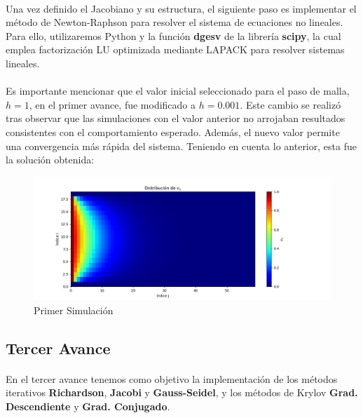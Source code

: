 \documentclass{article}
\begin{document}
  \paragraph{}
  Una vez definido el Jacobiano y su estructura, el siguiente paso es implementar el método de Newton-Raphson para resolver el sistema de ecuaciones no lineales. Para ello, utilizaremos Python y la función \textbf{dgesv} de la librería \textbf{scipy}, la cual emplea factorización LU optimizada mediante LAPACK para resolver sistemas lineales.

  \paragraph{}
  Es importante mencionar que el valor inicial seleccionado para el paso de malla, $h=1$, en el primer avance, fue modificado a $h=0.001$. Este cambio se realizó tras observar que las simulaciones con el valor anterior no arrojaban resultados consistentes con el comportamiento esperado. Además, el nuevo valor permite una convergencia más rápida del sistema. Teniendo en cuenta lo anterior, esta fue la solución obtenida:

  \begin{figure}[H]
    \centering
    \includegraphics[width=1.2\textwidth]{GaussJordanSol.png}
    \caption{Primer Simulación}
  \end{figure}

  \subsection*{Tercer Avance}
  \paragraph{}
  En el tercer avance tenemos como objetivo la implementación de los métodos iterativos \textbf{Richardson}, \textbf{Jacobi} y \textbf{Gauss-Seidel}, y los métodos de Krylov \textbf{Grad. Descendiente} y \textbf{Grad. Conjugado}.
\end{document}
